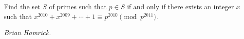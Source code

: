 Find the set $S$ of primes such that $p \in S$ if and only if there exists an integer $x$ such that $x^{2010} + x^{2009} + \cdots + 1 \equiv p^{2010} \pmod{p^{2011}}$.

\textit{Brian Hamrick.}